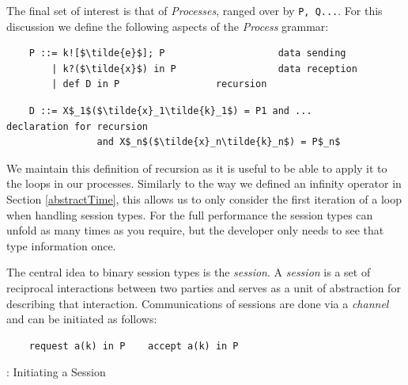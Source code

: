 \documentclass[11pt, abstracton, twoside, titlepage=true]{scrartcl}
\begin{document}
The final set of interest is that of \emph{Processes}, ranged over 
by \texttt{P, Q...}. For this discussion we define the following aspects 
of the \emph{Process} grammar:
\\
\begin{lstlisting}
    P ::= k![$\tilde{e}$]; P                    data sending
        | k?($\tilde{x}$) in P                  data reception
        | def D in P                 recursion
\end{lstlisting}
\begin{lstlisting}
    D ::= X$_1$($\tilde{x}_1\tilde{k}_1$) = P1 and ...           declaration for recursion
                and X$_n$($\tilde{x}_n\tilde{k}_n$) = P$_n$ 
\end{lstlisting}

We maintain this definition of recursion as it is useful to be able to apply it to 
the loops in our processes. Similarly to the way we defined an infinity operator in 
Section \ref{abstractTime}, this allows us to only consider the first iteration of a 
loop when handling session types. For the full performance the session types can 
unfold as many times as you require, but the developer only needs to see that 
type information once.

The central idea to binary session types is the \emph{session}. A \emph{session} 
is a set of reciprocal interactions between two parties and serves as a unit of 
abstraction for describing that interaction. Communications of sessions are done 
via a \emph{channel} and can be initiated as follows:

\begin{multicols}{2}

	\begin{minipage}{0.5\textwidth}
		\begin{verbatim}
    request a(k) in P    accept a(k) in P 
		\end{verbatim}
	\end{minipage}
	
	\begin{minipage}{0.5\textwidth}

\hspace*{15pt}: Initiating a Session
	\end{minipage}

\end{multicols}
\end{document}
